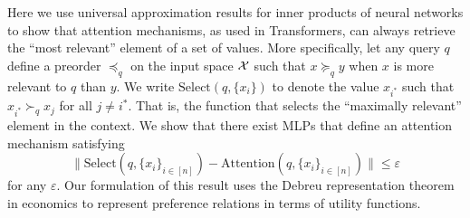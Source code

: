  Here we use universal approximation results for inner products of neural networks to show that attention mechanisms, as used in Transformers, can always retrieve the ``most relevant'' element of a set of values.  More specifically, let any query $q$ define a preorder $\preceq_q$ on the input space ${\mathcal{X}}$ such that $x \succeq_q y$ when $x$ is more relevant to $q$ than $y$. We write $\mathrm{Select}(q, \{x_i\})$ to denote the value $x_{i^*}$ such that $x_{i^*} \succ_q x_j$ for all $j \neq i^*$. That is, the function that selects the ``maximally relevant'' element in the context. We show that there exist MLPs that define an attention mechanism satisfying 
\[\|\mathrm{Select}(q, \{x_i\}_{i \in [n]}) - \mathrm{Attention}(q, \{x_i\}_{i \in [n]})\| \leq \varepsilon\]
for any $\varepsilon$. Our formulation of this result uses the Debreu representation theorem in economics to represent preference relations in terms of utility functions.